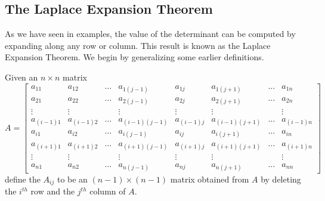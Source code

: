 \documentclass{ximera}
\begin{document}
\subsection*{The Laplace Expansion Theorem}
As we have seen in examples, the value of the determinant can be computed by expanding along any row or column.  This result is known as the Laplace Expansion Theorem.  We begin by generalizing some earlier definitions.

Given an $n\times n$ matrix 
$$A=\begin{bmatrix}a_{11} & a_{12} & \dots & a_{1(j-1)} & a_{1j} & a_{1(j+1)} & \dots & a_{1n}  \\
    a_{21} & a_{22} & \dots & a_{2(j-1)} & a_{2j} & a_{2(j+1)} & \dots & a_{2n}  \\
   \vdots & \vdots &  & \vdots & \vdots & \vdots &  & \vdots  \\
   a_{(i-1)1} & a_{(i-1)2} & \ldots & a_{(i-1)(j-1)} & a_{(i-1)j} & a_{(i-1)(j+1)} & \ldots & a_{(i-1)n}\\
  a_{i1} & a_{i2} & \ldots & a_{i(j-1)} & a_{ij} & a_{i(j+1)} & \ldots & a_{in}\\
  a_{(i+1)1} & a_{(i+1)2} & \ldots & a_{(i+1)(j-1)} & a_{(i+1)j} & a_{(i+1)(j+1)} & \ldots & a_{(i+1)n}\\
  \vdots & \vdots &  & \vdots & \vdots & \vdots &  & \vdots  \\
   a_{n1} & a_{n2} & \dots & a_{n(j-1)} & a_{nj} & a_{n(j+1)} & \dots & a_{nn}\end{bmatrix}$$
   define the  $A_{ij}$ to be an $(n-1)\times (n-1)$ matrix obtained from $A$ by deleting the $i^{th}$ row and the $j^{th}$ column of $A$.
\begin{center}
 \end{center} 
 
\end{document}
